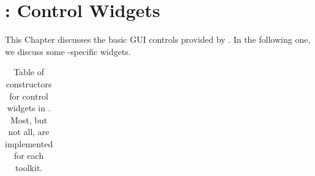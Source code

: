 \chapter{: Control Widgets}
\label{cha:control-widgets}

  

  
This Chapter discusses the basic GUI controls provided by
. In the following one, we discuss some \R-specific widgets.

\begin{table}
\centering
\label{tab:gWidgets-control-widgets}
\caption{Table of constructors for control widgets in . Most, but not all, are implemented for each toolkit.}
\begin{tabular}{@{}lp{}@{}}
\toprule


\end{tabular}
\end{table}
